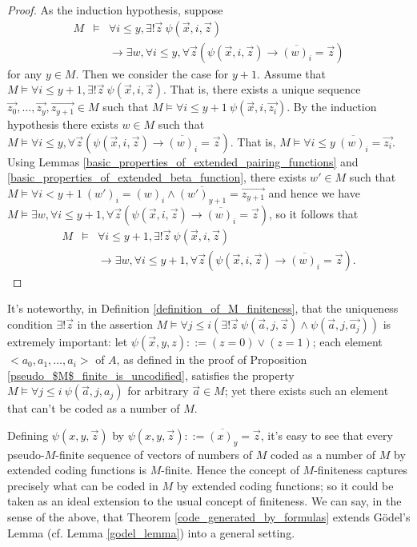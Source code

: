 \documentclass[a4paper,11pt]{article}
\begin{document}
\begin{proof}
As the induction hypothesis, suppose
\begin{eqnarray*}
  M &\models& \forall i\leq y, \exists!\vec{z}\ \psi(\vec{x},i,\vec{z}) \\
   &&  \rightarrow \exists w, \forall i\leq y, \forall \vec{z} ( \psi(\vec{x},i,\vec{z}) \rightarrow \overline{(w)_i} = \vec{z} )
\end{eqnarray*}
for any $y\in M$. Then we consider the case for $y + 1$. Assume that $M\models \forall i\leq y+1, \exists!\vec{z}\ \psi(\vec{x},i,\vec{z})$. That is, there exists a unique sequence $\vec{z_0},\ldots,\vec{z_y},\vec{z_{y+1}}\in M$ such that $M\models \forall i\leq y+1\ \psi(\vec{x},i,\vec{z_i})$. By the induction hypothesis there exists $w\in M$ such that $M\models \forall i\leq y, \forall \vec{z} ( \psi(\vec{x},i,\vec{z}) \rightarrow \overline{(w)_i} = \vec{z} )$. That is, $M\models \forall i\leq y\ \overline{(w)_i} = \vec{z_i}$. Using Lemmas \ref{basic_properties_of_extended_pairing_functions} and \ref{basic_properties_of_extended_beta_function}, there exists $w'\in M$ such that $M\models \forall i<y+1\ (w')_i = (w)_i \wedge \overline{(w')_{y+1}} = \vec{z_{y+1}}$ and hence we have $M\models \exists w, \forall i\leq y+1, \forall \vec{z} ( \psi(\vec{x},i,\vec{z}) \rightarrow \overline{(w)_i} = \vec{z} )$, so it follows that
\begin{eqnarray*}
   M&\models& \forall i\leq y+1, \exists!\vec{z}\ \psi(\vec{x},i,\vec{z}) \\
   && \rightarrow \exists w, \forall i\leq y+1, \forall \vec{z} ( \psi(\vec{x},i,\vec{z}) \rightarrow \overline{(w)_i} = \vec{z} ).
\end{eqnarray*}
\end{proof}

It's noteworthy, in Definition \ref{definition_of_M_finiteness}, that the uniqueness condition $\exists! \vec{z}$ in the assertion $M\models \forall j\leq i ( \exists! \vec{z}\ \psi(\vec{a},j,\vec{z}) \wedge \psi(\vec{a},j,\vec{a_j}) )$ is extremely important: let $\psi(\vec{x},y,z) ::= (z = 0) \vee (z = 1)$; each element $<a_0,a_1,\ldots,a_i>$ of $A$, as defined in the proof of Proposition \ref{pseudo_$M$_finite_is_uncodified}, satisfies the property $M\models \forall j\leq i\ \psi(\vec{a},j,a_j)$ for arbitrary $\vec{a}\in M$; yet there exists such an element that can't be coded as a number of $M$.

Defining $\psi(x,y,\vec{z})$ by $\psi(x,y,\vec{z}) ::= \overline{(x)_y} =  \vec{z}$, it's easy to see that every pseudo-$M$-finite sequence of vectors of numbers of $M$ coded as a number of $M$ by extended coding functions is $M$-finite. Hence the concept of $M$-finiteness captures precisely what can be coded in $M$ by extended coding functions; so it could be taken as an ideal extension to the usual concept of finiteness. We can say, in the sense of the above, that Theorem \ref{code_generated_by_formulas} extends G\"{o}del's Lemma (cf. Lemma \ref{godel_lemma}) into a general setting.
\end{document}

